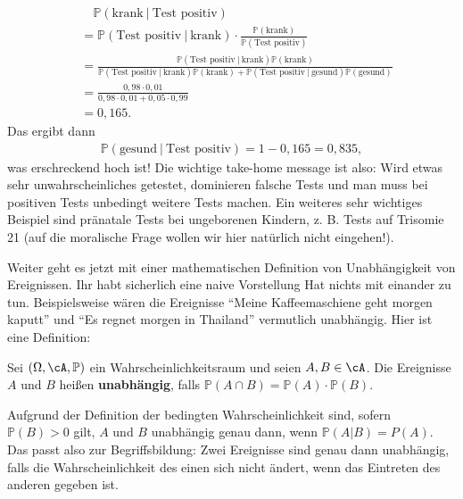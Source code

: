 \begin{beispiel}
\begin{enumerate}[label=(\roman*)]
		\begin{align*}
			&\quad \mathbb{P}(\text{krank} \: | \: \text{Test positiv})\\
			 &= \mathbb{P}(\text{Test positiv} \: | \: \text{krank}) \cdot \frac{\mathbb{P}(\text{krank})}{\mathbb{P}(\text{Test positiv})}\\
			&=	\frac{\mathbb{P}(\text{Test positiv} \: | \: \text{krank}) \mathbb{P}(\text{krank})}{\mathbb{P}(\text{Test positiv} \: | \: \text{krank})\mathbb{P}(\text{krank}) + \mathbb{P}(\text{Test positiv} \: | \: \text{gesund})\mathbb{P}(\text{gesund})}\\
			&= \frac{0,98 \cdot 0,01}{0,98 \cdot 0,01 + 0,05 \cdot 0,99} \\
			&= 0,165.
		\end{align*}
		Das ergibt dann
		\begin{align*}
			\mathbb{P}(\text{gesund} \: | \: \text{Test positiv}) = 1 - 0,165 = 0,835,
		\end{align*}
		was erschreckend hoch ist! Die wichtige take-home message ist also: Wird etwas sehr unwahrscheinliches getestet, dominieren falsche Tests und man muss bei positiven Tests unbedingt weitere Tests machen. Ein weiteres sehr wichtiges Beispiel sind pr\"anatale Tests bei ungeborenen Kindern, z. B. Tests auf Trisomie 21 (auf die moralische Frage wollen wir hier nat\"urlich nicht eingehen!).
	\end{enumerate}
\end{beispiel}
Weiter geht es jetzt mit einer mathematischen Definition von Unabh\"angigkeit von Ereignissen. Ihr habt sicherlich eine naive Vorstellung \glqq Hat nichts mit einander zu tun\grqq. Beispielsweise w\"aren die Ereignisse \enquote{Meine Kaffeemaschiene geht morgen kaputt} und \enquote{Es regnet morgen in Thailand} vermutlich unabh\"angig. Hier ist eine Definition:
\begin{deff}
	Sei $(\Omega, \cA, \mathbb{P})$ ein Wahrscheinlichkeitsraum und seien $A,B \in \cA$. Die Ereignisse $A$ und $B$ heißen \textbf{unabhängig}, falls $\mathbb{P}(A \cap B) = \mathbb{P}(A) \cdot \mathbb{P}(B)$.
\end{deff}
Aufgrund der Definition der bedingten Wahrscheinlichkeit sind, sofern $\mathbb P(B)>0$ gilt, $A$ und $B$ unabh\"angig genau dann, wenn $\mathbb P(A|B)=P(A)$. Das passt also zur Begriffsbildung: Zwei Ereignisse sind genau dann unabh\"angig, falls die Wahrscheinlichkeit des einen sich nicht \"andert, wenn das Eintreten des anderen gegeben ist.\smallskip

